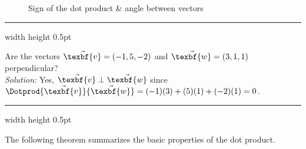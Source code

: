 \begin{figure}[h]
 \centering
 \qquad\qquad
 \qquad\qquad
 \caption[]{\quad Sign of the dot product \& angle between vectors}
 \label{fig:dotsign}
\end{figure}

\hrule width \textwidth height 0.5pt
\begin{exmp}
 Are the vectors $\vec{\texbf{v}} = (-1,5,-2)$ and $\vec{\texbf{w}} = (3,1,1)$ perpendicular?\vspace{2mm}\\\emph{Solution:}
 Yes, $\vec{\texbf{v}} \perp \vec{\texbf{w}}$ since $\Dotprod{\vec{\texbf{v}}}{\vec{\texbf{w}}} = (-1)(3) + (5)(1) + (-2)(1) = 0$.
\end{exmp}
\hrule width \textwidth height 0.5pt
\vspace{3mm}

The following theorem summarizes the basic properties of the dot product.


